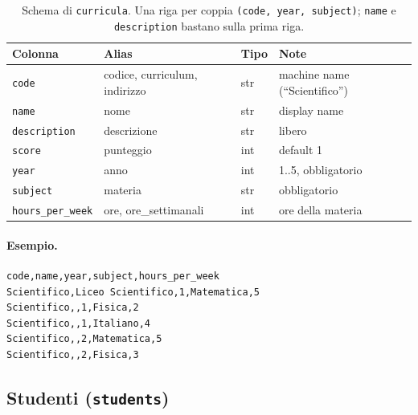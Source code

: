 \begin{table}[h]
\centering\small
\begin{tabular}{l l l p{4.6cm}}
\toprule
\textbf{Colonna} & \textbf{Alias} & \textbf{Tipo} & \textbf{Note} \\
\midrule
\texttt{code} & codice, curriculum, indirizzo & str & machine name (``Scientifico'') \\
\texttt{name} & nome & str & display name \\
\texttt{description} & descrizione & str & libero \\
\texttt{score} & punteggio & int & default 1 \\
\texttt{year} & anno & int & 1..5, obbligatorio \\
\texttt{subject} & materia & str & obbligatorio \\
\texttt{hours\_per\_week} & ore, ore\_settimanali & int & ore della materia \\
\bottomrule
\end{tabular}
\caption{Schema di \texttt{curricula}. Una riga per coppia
\texttt{(code, year, subject)}; \texttt{name} e
\texttt{description} bastano sulla prima riga.}
\label{tab:formato_curricula}
\end{table}

\paragraph{Esempio.}
\begin{lstlisting}
code,name,year,subject,hours_per_week
Scientifico,Liceo Scientifico,1,Matematica,5
Scientifico,,1,Fisica,2
Scientifico,,1,Italiano,4
Scientifico,,2,Matematica,5
Scientifico,,2,Fisica,3
\end{lstlisting}

\subsection{Studenti (\texttt{students})}

